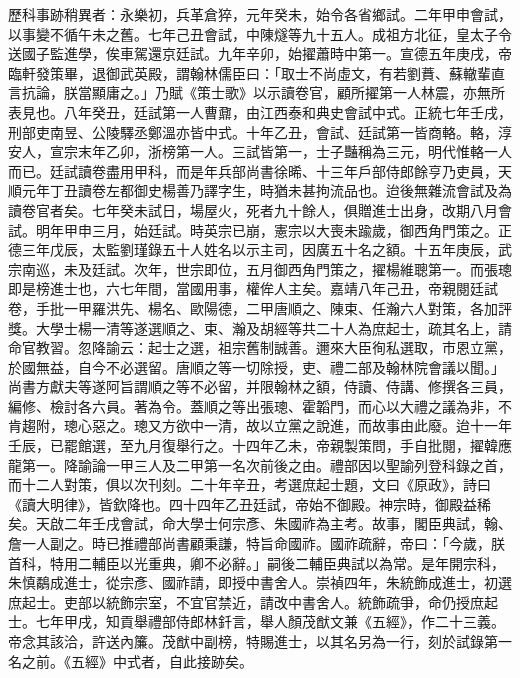 歷科事跡稍異者：永樂初，兵革倉猝，元年癸未，始令各省鄉試。二年甲申會試，以事變不循午未之舊。七年己丑會試，中陳燧等九十五人。成祖方北征，皇太子令送國子監進學，俟車駕還京廷試。九年辛卯，始擢蕭時中第一。宣德五年庚戌，帝臨軒發策畢，退御武英殿，謂翰林儒臣曰：「取士不尚虛文，有若劉蕡、蘇轍輩直言抗論，朕當顯庸之。」乃賦《策士歌》以示讀卷官，顧所擢第一人林震，亦無所表見也。八年癸丑，廷試第一人曹鼐，由江西泰和典史會試中式。正統七年壬戌，刑部吏南昱、公陵驛丞鄭溫亦皆中式。十年乙丑，會試、廷試第一皆商輅。輅，淳安人，宣宗末年乙卯，浙榜第一人。三試皆第一，士子豔稱為三元，明代惟輅一人而已。廷試讀卷盡用甲科，而是年兵部尚書徐晞、十三年戶部侍郎餘亨乃吏員，天順元年丁丑讀卷左都御史楊善乃譯字生，時猶未甚拘流品也。迨後無雜流會試及為讀卷官者矣。七年癸未試日，場屋火，死者九十餘人，俱贈進士出身，改期八月會試。明年甲申三月，始廷試。時英宗已崩，憲宗以大喪未踰歲，御西角門策之。正德三年戊辰，太監劉瑾錄五十人姓名以示主司，因廣五十名之額。十五年庚辰，武宗南巡，未及廷試。次年，世宗即位，五月御西角門策之，擢楊維聰第一。而張璁即是榜進士也，六七年間，當國用事，權侔人主矣。嘉靖八年己丑，帝親閱廷試卷，手批一甲羅洪先、楊名、歐陽德，二甲唐順之、陳束、任瀚六人對策，各加評獎。大學士楊一清等遂選順之、束、瀚及胡經等共二十人為庶起士，疏其名上，請命官教習。忽降諭云：起士之選，祖宗舊制誠善。邇來大臣徇私選取，市恩立黨，於國無益，自今不必選留。唐順之等一切除授，吏、禮二部及翰林院會議以聞。」尚書方獻夫等遂阿旨謂順之等不必留，并限翰林之額，侍讀、侍講、修撰各三員，編修、檢討各六員。著為令。蓋順之等出張璁、霍韜門，而心以大禮之議為非，不肯趨附，璁心惡之。璁又方欲中一清，故以立黨之說進，而故事由此廢。迨十一年壬辰，已罷館選，至九月復舉行之。十四年乙未，帝親製策問，手自批閱，擢韓應龍第一。降諭論一甲三人及二甲第一名次前後之由。禮部因以聖諭列登科錄之首，而十二人對策，俱以次刊刻。二十年辛丑，考選庶起士題，文曰《原政》，詩曰《讀大明律》，皆欽降也。四十四年乙丑廷試，帝始不御殿。神宗時，御殿益稀矣。天啟二年壬戌會試，命大學士何宗彥、朱國祚為主考。故事，閣臣典試，翰、詹一人副之。時已推禮部尚書顧秉謙，特旨命國祚。國祚疏辭，帝曰：「今歲，朕首科，特用二輔臣以光重典，卿不必辭。」嗣後二輔臣典試以為常。是年開宗科，朱慎鷸成進士，從宗彥、國祚請，即授中書舍人。崇禎四年，朱統飾成進士，初選庶起士。吏部以統飾宗室，不宜官禁近，請改中書舍人。統飾疏爭，命仍授庶起士。七年甲戌，知貢舉禮部侍郎林釺言，舉人顏茂猷文兼《五經》，作二十三義。帝念其該洽，許送內簾。茂猷中副榜，特賜進士，以其名另為一行，刻於試錄第一名之前。《五經》中式者，自此接跡矣。


